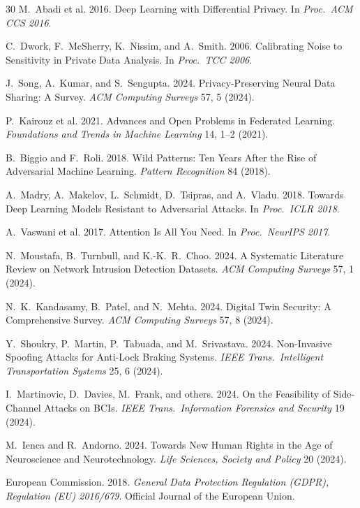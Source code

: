 \documentclass[sigconf,nonacm]{acmart}
\begin{document}
\begin{thebibliography}{30}
M.~Abadi et al. 2016. Deep Learning with Differential Privacy.
In \textit{Proc.\ ACM CCS 2016}.

C.~Dwork, F.~McSherry, K.~Nissim, and A.~Smith. 2006. Calibrating
Noise to Sensitivity in Private Data Analysis.
In \textit{Proc.\ TCC 2006}.

J.~Song, A.~Kumar, and S.~Sengupta. 2024. Privacy-Preserving
Neural Data Sharing: A Survey.
\textit{ACM Computing Surveys} 57, 5 (2024).

P.~Kairouz et al. 2021. Advances and Open Problems in Federated
Learning. \textit{Foundations and Trends in Machine Learning} 14,
1--2 (2021).

B.~Biggio and F.~Roli. 2018. Wild Patterns: Ten Years After the
Rise of Adversarial Machine Learning.
\textit{Pattern Recognition} 84 (2018).

A.~Madry, A.~Makelov, L.~Schmidt, D.~Tsipras, and A.~Vladu. 2018.
Towards Deep Learning Models Resistant to Adversarial Attacks.
In \textit{Proc.\ ICLR 2018}.

A.~Vaswani et al. 2017. Attention Is All You Need.
In \textit{Proc.\ NeurIPS 2017}.

N.~Moustafa, B.~Turnbull, and K.-K.~R.~Choo. 2024. A Systematic
Literature Review on Network Intrusion Detection Datasets.
\textit{ACM Computing Surveys} 57, 1 (2024).

N.~K.~Kandasamy, B.~Patel, and N.~Mehta. 2024. Digital Twin
Security: A Comprehensive Survey.
\textit{ACM Computing Surveys} 57, 8 (2024).

Y.~Shoukry, P.~Martin, P.~Tabuada, and M.~Srivastava. 2024.
Non-Invasive Spoofing Attacks for Anti-Lock Braking Systems.
\textit{IEEE Trans.\ Intelligent Transportation Systems}
25, 6 (2024).

I.~Martinovic, D.~Davies, M.~Frank, and others. 2024. On the
Feasibility of Side-Channel Attacks on BCIs.
\textit{IEEE Trans.\ Information Forensics and Security} 19 (2024).

M.~Ienca and R.~Andorno. 2024. Towards New Human Rights in the
Age of Neuroscience and Neurotechnology.
\textit{Life Sciences, Society and Policy} 20 (2024).

European Commission. 2018. \textit{General Data Protection
Regulation (GDPR), Regulation (EU) 2016/679}. Official Journal
of the European Union.


\end{thebibliography}
\end{document}
